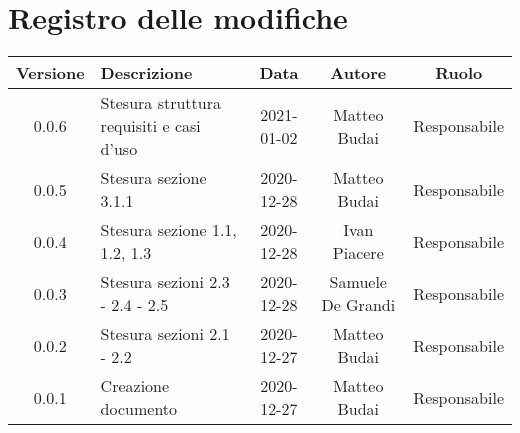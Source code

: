 \section*{Registro delle modifiche}

\begin{center}
	\begin{longtable}{|c|p{5cm}|c|c|c|}
		\hline
		\rowcolor{lighter-grayer}
		\textbf{Versione} & \textbf{Descrizione} & \textbf{Data} & \textbf{Autore} & \textbf{Ruolo} \\
		\hline
		\endfirsthead
		
		0.0.6 & Stesura struttura requisiti e casi d'uso & 2021-01-02 & Matteo Budai & Responsabile \\
		\hline
		0.0.5 & Stesura sezione 3.1.1 & 2020-12-28 & Matteo Budai & Responsabile \\
		\hline
		0.0.4 & Stesura sezione 1.1, 1.2, 1.3 & 2020-12-28 & Ivan Piacere & Responsabile \\
		\hline
		0.0.3 & Stesura sezioni 2.3 - 2.4 - 2.5 & 2020-12-28 & Samuele De Grandi & Responsabile \\
		\hline
		0.0.2 & Stesura sezioni 2.1 - 2.2 & 2020-12-27 & Matteo Budai & Responsabile \\
		\hline
		0.0.1 & Creazione documento & 2020-12-27 & Matteo Budai & Responsabile \\
		\hline
		
	\end{longtable}
\end{center}